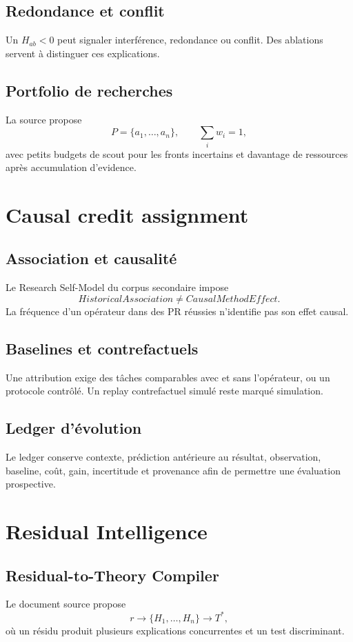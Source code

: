 \section{Redondance et conflit}
Un $H_{ab}<0$ peut signaler interférence, redondance ou conflit. Des ablations servent à distinguer ces explications.

\section{Portfolio de recherches}
La source propose
\[
P=\{a_1,\dots,a_n\},\qquad \sum_i w_i=1,
\]
avec petits budgets de scout pour les fronts incertains et davantage de ressources après accumulation d'evidence.

\chapter{Causal credit assignment}
\section{Association et causalité}
Le Research Self-Model du corpus secondaire impose
\[
HistoricalAssociation\neq CausalMethodEffect.
\]
La fréquence d'un opérateur dans des PR réussies n'identifie pas son effet causal.

\section{Baselines et contrefactuels}
Une attribution exige des tâches comparables avec et sans l'opérateur, ou un protocole contrôlé. Un replay contrefactuel simulé reste marqué simulation.

\section{Ledger d'évolution}
Le ledger conserve contexte, prédiction antérieure au résultat, observation, baseline, coût, gain, incertitude et provenance afin de permettre une évaluation prospective.

\chapter{Residual Intelligence}
\section{Residual-to-Theory Compiler}
Le document source propose
\[
r\to\{H_1,\dots,H_n\}\to T^*,
\]
où un résidu produit plusieurs explications concurrentes et un test discriminant.

